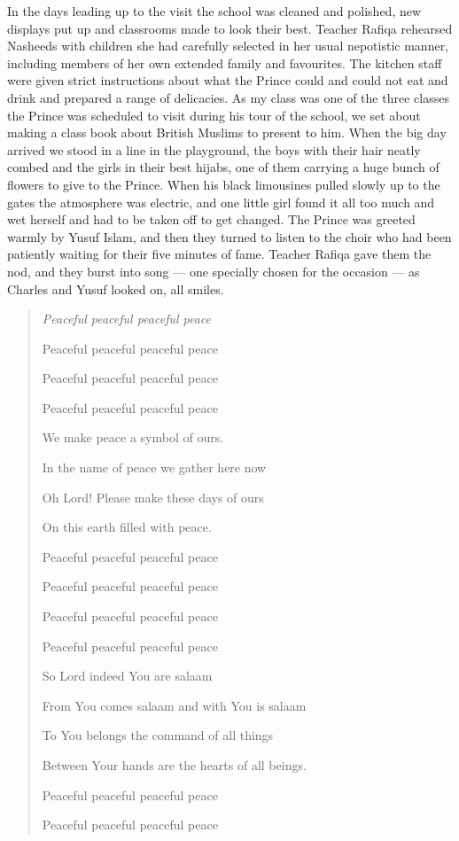 \documentclass[12pt]{memoir}
\begin{document}
In the days leading up to the visit the school was cleaned and polished,
new displays put up and classrooms made to look their best.
Teacher Rafiqa rehearsed Nasheeds with children she had carefully selected
in her usual nepotistic manner,
including members of her own extended family and favourites.
The kitchen staff were given strict instructions about what the Prince could
and could not eat and drink and prepared a range of delicacies.
As my class was one of the three classes the Prince was scheduled to visit
during his tour of the school,
we set about making a class book about British Muslims to present to him.
When the big day arrived we stood in a line in the playground,
the boys with their hair neatly combed and the girls in their best hijabs,
one of them carrying a huge bunch of flowers to give to the Prince.
When his black limousines pulled slowly up to the gates
the atmosphere was electric, and one little girl found it all too much
and wet herself and had to be taken off to get changed.
The Prince was greeted warmly by Yusuf Islam,
and then they turned to listen to the choir
who had been patiently waiting for their five minutes of fame.
Teacher Rafiqa gave them the nod, and they burst into song —
one specially chosen for the occasion —
as Charles and Yusuf looked on, all smiles.

\begin{quote}
\itshape
Peaceful peaceful peaceful peace

Peaceful peaceful peaceful peace

Peaceful peaceful peaceful peace

Peaceful peaceful peaceful peace

We make peace a symbol of ours.

In the name of peace we gather here now

Oh Lord! Please make these days of ours

On this earth filled with peace.

Peaceful peaceful peaceful peace

Peaceful peaceful peaceful peace

Peaceful peaceful peaceful peace

Peaceful peaceful peaceful peace

So Lord indeed You are salaam

From You comes salaam and with You is salaam

To You belongs the command of all things

Between Your hands are the hearts of all beings.

Peaceful peaceful peaceful peace

Peaceful peaceful peaceful peace
\end{quote}
\end{document}
